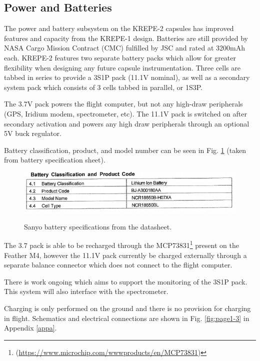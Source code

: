 \documentclass{article}
\begin{document}
\subsection{Power and Batteries}

The power and battery subsystem on the KREPE-2 capsules has improved features and capacity from the KREPE-1 design. Batteries are still provided by NASA Cargo Mission Contract (CMC) fulfilled by JSC and rated at 3200mAh each. KREPE-2 features two separate battery packs which allow for greater flexibility when designing any future capsule instrumentation. Three cells are tabbed in series to provide a 3S1P pack (11.1V nominal), as well as a secondary system pack which consists of 3 cells tabbed in parallel, or 1S3P. %

The 3.7V pack powers the flight computer, but not any high-draw peripherals (GPS, Iridium modem, spectrometer, etc). The 11.1V pack is switched on after secondary activation and powers any high draw peripherals through an optional 5V buck regulator. 

Battery classification, product, and model number can be seen in Fig. \ref{fig:bat-spec} (taken from battery specification sheet).

\begin{figure}[h!]
	\centering
	\includegraphics[width=12cm]{images/battery-spec.png}
	\label{fig:bat-spec}
	\caption{Sanyo battery specifications from the datasheet.}
\end{figure}

The 3.7 pack is able to be recharged through the MCP73831\footnote{ (\url{https://www.microchip.com/wwwproducts/en/MCP73831})} present on the Feather M4, however the 11.1V pack currently be charged externally through a separate balance connector which does not connect to the flight computer.  

There is work ongoing which aims to support the monitoring of the 3S1P pack. This system will also interface with the spectrometer. 

Charging is only performed on the ground and there is no provision for charging in flight. Schematics and electrical connections are shown in Fig. \ref{fig:page1-3} in Appendix \ref{appa}.
\end{document}
